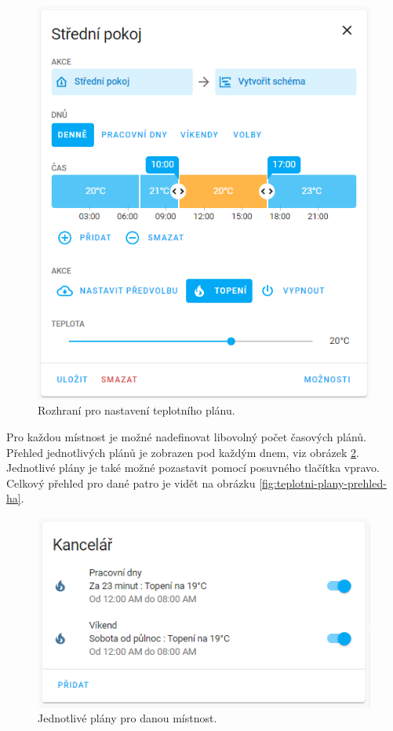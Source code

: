 \begin{figure}[H]
    \centering
    \includegraphics[width=\textwidth]{images/software-ha/teplotni-plan-ha.png}
    \caption{Rozhraní pro nastavení teplotního plánu.}
    \label{fig:teplotni-plan-ha}
\end{figure}

Pro každou místnost je možné nadefinovat libovolný počet časových plánů. Přehled jednotlivých plánů je zobrazen pod každým dnem, viz obrázek \ref{fig:teplotni-plany-ha}. Jednotlivé plány je také možné pozastavit pomocí posuvného tlačítka vpravo. Celkový přehled pro dané patro je vidět na obrázku \ref{fig:teplotni-plany-prehled-ha}.

\begin{figure}[H]
    \centering
    \includegraphics[width=\textwidth]{images/software-ha/teplotni-plany-ha.png}
    \caption{Jednotlivé plány pro danou místnost.}
    \label{fig:teplotni-plany-ha}
\end{figure}


